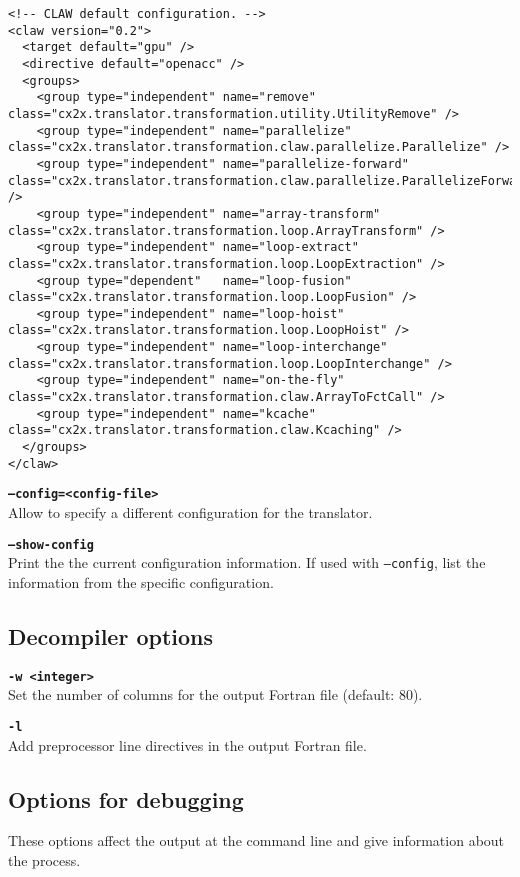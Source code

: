 \documentclass{article}
\begin{document}
\begin{lstlisting}
<!-- CLAW default configuration. -->
<claw version="0.2">
  <target default="gpu" />
  <directive default="openacc" />
  <groups>
    <group type="independent" name="remove"              class="cx2x.translator.transformation.utility.UtilityRemove" />
    <group type="independent" name="parallelize"         class="cx2x.translator.transformation.claw.parallelize.Parallelize" />
    <group type="independent" name="parallelize-forward" class="cx2x.translator.transformation.claw.parallelize.ParallelizeForward" />
    <group type="independent" name="array-transform"     class="cx2x.translator.transformation.loop.ArrayTransform" />
    <group type="independent" name="loop-extract"        class="cx2x.translator.transformation.loop.LoopExtraction" />
    <group type="dependent"   name="loop-fusion"         class="cx2x.translator.transformation.loop.LoopFusion" />
    <group type="independent" name="loop-hoist"          class="cx2x.translator.transformation.loop.LoopHoist" />
    <group type="independent" name="loop-interchange"    class="cx2x.translator.transformation.loop.LoopInterchange" />
    <group type="independent" name="on-the-fly"          class="cx2x.translator.transformation.claw.ArrayToFctCall" />
    <group type="independent" name="kcache"              class="cx2x.translator.transformation.claw.Kcaching" />
  </groups>
</claw>
\end{lstlisting}

\textbf{\texttt{--config=<config-file>}}\\
Allow to specify a different configuration for the translator.

\textbf{\texttt{--show-config}}\\
Print the the current configuration information. If used with \texttt{--config}, list the information from the specific configuration.

\subsection{Decompiler options}
\textbf{\texttt{-w <integer>}}\\
Set the number of columns for the output Fortran file (default: 80).

\textbf{\texttt{-l}}\\
Add preprocessor line directives in the output Fortran file.

\subsection{Options for debugging}
These options affect the output at the command line and give information about the process.
\end{document}
